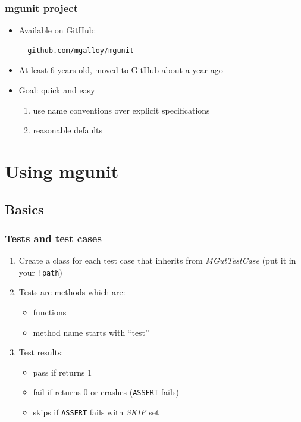 \documentclass[12pt, handout]{beamer}
\begin{document}
\begin{frame}[t, fragile]
  \frametitle{mgunit project}
  \begin{itemize}
    \item Available on GitHub:

\begin{lstlisting}
  github.com/mgalloy/mgunit
\end{lstlisting}

    \item At least 6 years old, moved to GitHub about a year ago
    \item Goal: quick and easy
    \begin{enumerate}
      \item use name conventions over explicit specifications
      \item reasonable defaults
    \end{enumerate}
  \end{itemize}
\end{frame}


\section{Using mgunit}
\subsection{Basics}

\begin{frame}[t, fragile]
  \frametitle{Tests and test cases}
  \begin{enumerate}
    \item Create a class for each test case that inherits from {\em MGutTestCase} (put it in your {\tt !path})
    \item Tests are methods which are:
      \begin{itemize} 
        \item functions
        \item method name starts with ``test''
      \end{itemize}
    \item Test results:
      \begin{itemize}
        \item pass if returns 1
        \item fail if returns 0 or crashes ({\tt ASSERT} fails)
        \item skips if {\tt ASSERT} fails with {\em SKIP} set
      \end{itemize}
  \end{enumerate}
\end{frame}
\end{document}
